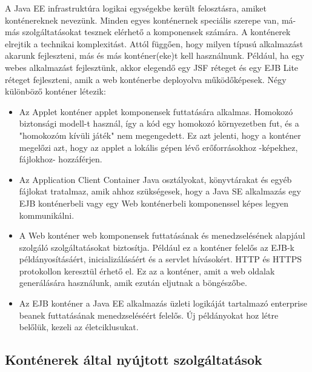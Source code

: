 \documentclass[centeredchapter]{thesis-ekf}
\theoremstyle{definition}
\theoremstyle{remark}
\begin{document}
A Java EE infrastruktúra logikai egységekbe került felosztásra, amiket konténereknek nevezünk. Minden egyes konténernek speciális szerepe van, má-más szolgáltatásokat tesznek elérhető a komponensek számára. A konténerek elrejtik a technikai komplexitást.
Attól függően, hogy milyen típusú alkalmazást akarunk fejleszteni, más és más konténer(eke)t kell használnunk. Például, ha egy webes alkalmazást fejlesztünk, akkor elegendő egy JSF réteget és egy EJB Lite réteget fejleszteni, amik a web konténerbe deployolva működőképesek.
Négy különböző konténer létezik:\cite{BJEE}
\begin{itemize}
	\item Az Applet konténer applet komponensek futtatására alkalmas. Homokozó biztonsági modell-t használ, így a kód egy homokozó környezetben fut, és a "homokozóm kívüli játék" nem megengedett.
	Ez azt jelenti, hogy a konténer megelőzi azt, hogy az applet a lokális gépen lévő erőforrásokhoz -képekhez, fájlokhoz- hozzáférjen.
	\item Az Application Client Container Java osztályokat, könyvtárakat és egyéb fájlokat tratalmaz, amik ahhoz szükségesek, hogy a Java SE alkalmazás egy EJB konténerbeli vagy egy Web konténerbeli komponenssel képes legyen kommunikálni.
	\item A Web konténer web komponensek futtatásának és menedzselésének alapjául szolgáló szolgáltatásokat biztosítja. Például ez a konténer felelős az EJB-k példányosításáért, inicializálásáért és a servlet hívásokért. HTTP és HTTPS protokollon keresztül érhető el. Ez az a konténer, amit a web oldalak generálására használunk, amik ezután eljutnak a böngészőbe.
	\item Az EJB konténer a Java EE alkalmazás üzleti logikáját tartalmazó enterprise beanek futtatásának menedzseléséért felelős. Új példányokat hoz létre belőlük, kezeli az életciklusukat.
\end{itemize}

\subsection{Konténerek által nyújtott szolgáltatások}
\end{document}
